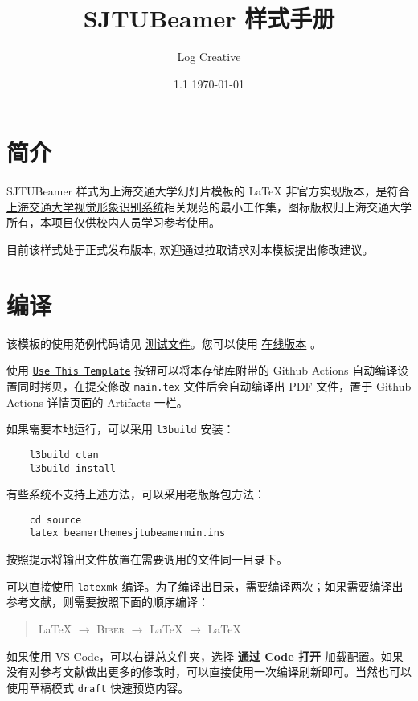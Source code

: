 \documentclass[a4paper,12pt]{article}
\begin{document}
\title{\textsf{SJTUBeamer}  样式手册}
\author{Log Creative}
\date{1.1 \today}
\maketitle

\tableofcontents    %

\clearpage

\section{简介}

\textsf{SJTUBeamer}  样式为上海交通大学幻灯片模板的 \LaTeX{} 非官方实现版本，是符合\href{http://vi.sjtu.edu.cn/}{上海交通大学视觉形象识别系统}相关规范的最小工作集，图标版权归上海交通大学所有，本项目仅供校内人员学习参考使用。

目前该样式处于正式发布版本, 欢迎通过拉取请求对本模板提出修改建议。

\section{编译}

该模板的使用范例代码请见 \href{https://github.com/LogCreative/SJTUBeamer/blob/main/doc/red.tex}{测试文件}。您可以使用 \href{https://www.overleaf.com/latex/templates/sjtubeamermin/shxnnnjjgqvp}{在线版本} 。

使用 \href{https://github.com/LogCreative/SJTUBeamer/generate}{\texttt{Use This Template}} 按钮可以将本存储库附带的 Github Actions 自动编译设置同时拷贝，在提交修改 \verb"main.tex" 文件后会自动编译出 PDF 文件，置于 Github Actions 详情页面的 Artifacts 一栏。

如果需要本地运行，可以采用 \verb"l3build" 安装：
\begin{verbatim}
	l3build ctan
	l3build install
\end{verbatim}

有些系统不支持上述方法，可以采用老版解包方法：
\begin{verbatim}
	cd source
	latex beamerthemesjtubeamermin.ins
\end{verbatim}
按照提示将输出文件放置在需要调用的文件同一目录下。

可以直接使用 \verb"latexmk" 编译。为了编译出目录，需要编译两次；如果需要编译出参考文献，则需要按照下面的顺序编译：
\begin{quotation}
    \LaTeX{} $\rightarrow$ \textsc{Biber} $\rightarrow$ \LaTeX{} $\rightarrow$ \LaTeX{}
\end{quotation}
如果使用 VS Code，可以右键总文件夹，选择 \textbf{通过 Code 打开} 加载配置。如果没有对参考文献做出更多的修改时，可以直接使用一次编译刷新即可。当然也可以使用草稿模式 \verb"draft" 快速预览内容。
\end{document}
